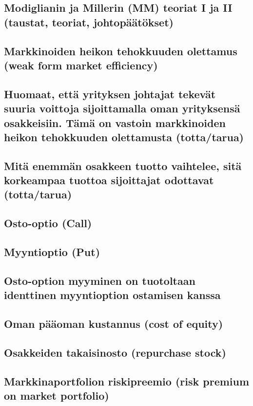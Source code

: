 \documentclass[a4paper]{article}
\begin{document}
\subsection{Modiglianin ja Millerin (MM) teoriat I ja II (taustat, teoriat, johtopäätökset)}

\subsection{Markkinoiden heikon tehokkuuden olettamus (weak form market efficiency)}

\subsection{Huomaat, että yrityksen johtajat tekevät suuria voittoja sijoittamalla oman yrityksensä osakkeisiin. Tämä on vastoin markkinoiden heikon tehokkuuden olettamusta (totta/tarua)}

\subsection{Mitä enemmän osakkeen tuotto vaihtelee, sitä korkeampaa tuottoa sijoittajat odottavat (totta/tarua)}

\subsection{Osto-optio (Call)}

\subsection{Myyntioptio (Put)}

\subsection{Osto-option myyminen on tuotoltaan identtinen myyntioption ostamisen kanssa}

\subsection{Oman pääoman kustannus (cost of equity)}

\subsection{Osakkeiden takaisinosto (repurchase stock)}

\subsection{Markkinaportfolion riskipreemio (risk premium on market portfolio)}
\end{document}
